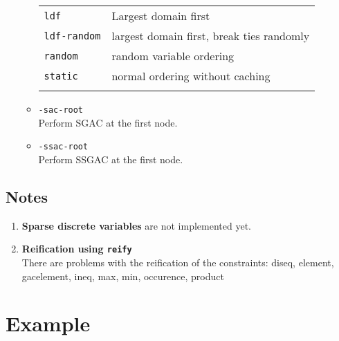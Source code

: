 \documentclass{article}
\begin{document}
\begin{small}
\begin{enumerate}
\begin{itemize}
\begin{tabular}{ll}
        \texttt{ldf} & Largest domain first\\
        \texttt{ldf-random} & largest domain first, break ties randomly\\
	\texttt{random} & random variable ordering\\
	\texttt{static} & normal ordering without caching \\
        & \\
      \end{tabular}
      \item \texttt{-sac-root}\\
	Perform SGAC at the first node. 
      \item \texttt{-ssac-root}\\
	Perform SSGAC at the first node. 
   \end{itemize}
\end{enumerate}



\subsection*{Notes}
\begin{enumerate}
 \item \textbf{Sparse discrete variables} are not implemented yet. 

  \item \textbf{Reification using \texttt{reify}} \\
    There are problems with the reification of the constraints: 
    diseq, element, gacelement, ineq, max, min, occurence, product

\end{enumerate}



\clearpage
\section{Example}\label{sect_example}


\end{small}
\end{document}
